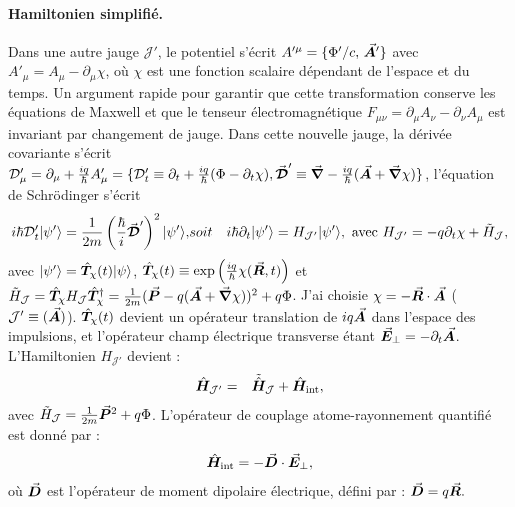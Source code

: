 \paragraph{Hamiltonien simplifié.}

Dans une autre jauge $\mathcal{J}'$, le potentiel s’écrit $A'^\mu = \{ \Phi'/c,\, \vec{{\bm{A}}}' \}$ avec $ A'_\mu = A_\mu - \partial_\mu \chi$, où $\chi$ est une fonction scalaire dépendant de l’espace et du temps. Un argument rapide pour garantir que cette transformation conserve les équations de Maxwell et que le tenseur électromagnétique
\(
F_{\mu\nu} = \partial_\mu A_\nu - \partial_\nu A_\mu
\)
est invariant par changement de jauge. Dans cette nouvelle jauge, la dérivée covariante s'écrit $\mathcal{D}_\mu' = \partial_\mu + \frac{iq}{\hbar} A_\mu' = \{ \mathcal{D}_t' \equiv \partial_t + \frac{iq}{\hbar} ( \Phi - \partial_t \chi )   , \vec{{\bm{\mathcal{D}}}}' \equiv \vec{{\bm{\nabla}}} - \frac{iq}{\hbar} (\vec{{\bm{A}}} + \vec{{\bm{\nabla}}}\chi)\} $, l’équation de Schrödinger s'écrit
\begin{eqnarray}
	i\hbar \mathcal{D}_t' \vert \psi' \rangle = \frac{1}{2m} \left( \frac{\hbar}{i} \operatorvec{\mathcal{D}}' \right)^2 \vert \psi' \rangle, & soit &  i\hbar \partial_t \vert \psi' \rangle = H_{\mathcal{J}'} \vert \psi' \rangle , ~\mbox{avec}~	H_{\mathcal{J}'} = -q\partial_t \chi + \tilde{H}_{\mathcal{J}},%
\end{eqnarray}
avec $\vert \psi'\rangle = \hat{\bm{T}}_\chi(t) \vert \psi\rangle$, $\hat{\bm{T}}_\chi(t) \equiv \exp\left( \frac{iq}{\hbar} \chi(\vec{{\bm{R}}}, t) \right)$ et $\tilde{H}_{\mathcal{J}} = \hat{\bm{T}}_\chi H_{\mathcal{J}}\hat{\bm{T}}_\chi^\dag = \frac{1}{2m} ( \vec{{\bm{P}}} - q  ( \vec{{\bm{A}}} + \vec{{\bm{\nabla}}}\chi  )  )^2 + q \Phi $. J'ai choisie $\chi = - \vec{{\bm{R}}}\cdot\vec{{\bm{A}}}$ (\ie $\mathcal{J}' \equiv (\vec{{\bm{A}}})$). $\hat{\bm{T}}_\chi(t)$ devient un opérateur translation de $iq \vec{{\bm{A}}}$ dans l’espace des impulsions, et l'opérateur champ électrique transverse étant $\vec{{\bm{E}}}_\perp = - \partial_t \vec{{\bm{A}}}$. L'Hamiltonien $H_{\mathcal{J}'}$ devient :
\begin{eqnarray}
	\hat{\bm{H}}_{\mathcal{J}'} & = & 	\tilde{\hat{\bm{H}}}_{\mathcal{J}}	+ \hat{\bm{H}}_{\text{int}},
\end{eqnarray}
avec $\tilde{H}_{\mathcal{J}} = \frac{1}{2m}\vec{{\bm{P}}}^2 +q \Phi$. L’opérateur de couplage atome-rayonnement quantifié est donné par :
\begin{eqnarray}
\hat{\bm{H}}_{\text{int}} = - \vec{{\bm{D}}} \cdot \vec{{\bm{E}}}_\perp,
\end{eqnarray}
où \(\vec{{\bm{D}}}\) est l’opérateur de moment dipolaire électrique, défini par :
\(
\vec{{\bm{D}}} = q \vec{{\bm{R}}}.
\)



